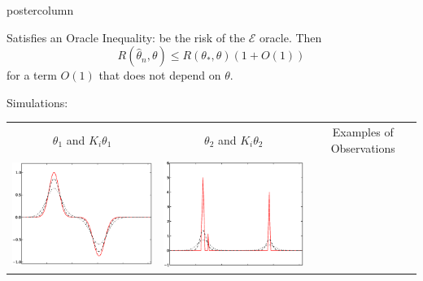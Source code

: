 \documentclass[final]{beamer}
\begin{document}
\begin{frame}
\begin{columns}
\begin{column}{.32\textwidth}
\begin{beamercolorbox}[center,wd=\textwidth]{postercolumn}
\begin{minipage}[T]{.95\textwidth}
{\begin{block}{Satisfies an Oracle Inequality:}
{                    be the risk of the $\mathcal{E}$ oracle.  Then
                    \begin{equation*}
                      R\left(\hat \theta_n,\theta \right) \leq R(\theta_*,\theta)(1 + O(1))
                    \end{equation*}
                    for a term $O(1)$ that does not depend on $\theta$.}
            \end{block}

            \begin{block}{Simulations:}
              \begin{table}
                \centering
                \begin{tabular}{cccc}
                  $\theta_1$ and $K_i\theta_1$ & $\theta_2$ and $K_i\theta_2$
                  & \multicolumn{2}{c}{Examples of Observations} \\
                  \includegraphics[width=3.4in,trim=0 30 0 0,clip]{./figures/thetasmooth.eps} &
                  \includegraphics[width=3.4in,trim=0 30 0 0,clip]{./figures/thetapeaked.eps} &

\end{tabular}
\end{table}
\end{block}}
\end{minipage}
\end{beamercolorbox}
\end{column}
\end{columns}
\end{frame}
\end{document}
